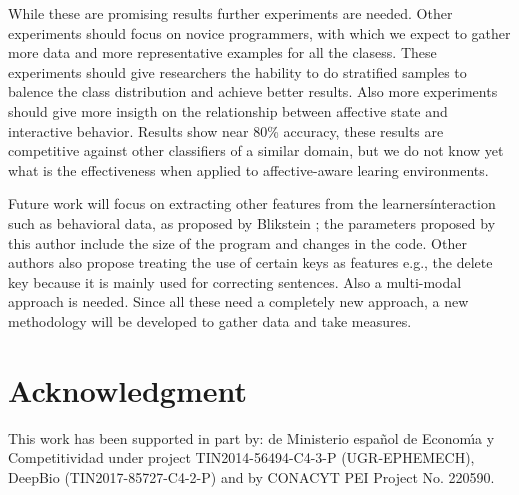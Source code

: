 \documentclass[a4paper,twoside]{article}
\begin{document}
While these are promising results further experiments are
needed. Other experiments should focus on novice programmers, with
which we expect to gather more data and more representative examples for all the
clasess. These experiments should give researchers the hability to do stratified samples to balence
the class distribution and achieve better results. Also more experiments should
give more insigth on the relationship between affective state  and interactive
behavior. Results show near 80\% accuracy, these results  are competitive
against other classifiers of a similar domain, but we do not know yet what is
the effectiveness when applied to affective-aware learing environments.   

Future work will focus on extracting other features from the learners\' interaction such as behavioral data, as proposed by Blikstein
\cite{blikstein2011using}; the parameters proposed by this author
include the size of the program and changes in the code. Other authors
also propose treating the use of certain keys as features e.g., the
delete key because it is mainly used for correcting sentences. Also a multi-modal approach is needed. Since all these need a completely new approach, a new methodology will be developed to
gather data and take measures.

\section*{Acknowledgment}
This work has been supported in part by: de Ministerio espa\~{n}ol de
Econom\'{\i}a y Competitividad under project TIN2014-56494-C4-3-P
(UGR-EPHEMECH),  DeepBio (TIN2017-85727-C4-2-P) and by CONACYT PEI Project No. 220590.




\vfill
\end{document}
